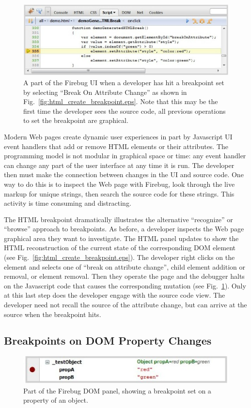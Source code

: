 \documentclass{www2010-accepted}
\begin{document}
\begin{figure}[htp]
\center
\includegraphics[scale=0.7]{html_mutation_on_break.eps}
\caption{A part of the Firebug UI when a developer has hit a breakpoint set by selecting ``Break On Attribute Change'' as shown in Fig.~\ref{fig:html_create_breakpoint.eps}. Note that this may be the first time the
developer sees the source code, all previous operations to set the breakpoint are graphical.}
\label{fig:html_mutation_on_break.eps}
\end{figure}

Modern Web pages create dynamic user experiences in part by Javascript
UI event handlers that add or remove HTML elements or their
attributes. The programming model is not modular in graphical space or
time: any event handler can change any part of the user interface at
any time it is run. The developer then must make the connection
between changes in the UI and source code. One way to do this is to
inspect the Web page with Firebug, look through the live markup for
unique strings, then search the source code for these strings. This
activity is time consuming and distracting.


The HTML breakpoint dramatically illustrates the alternative ``recognize'' or
``browse'' approach to breakpoints. As before, a developer inspects
the Web page graphical area they want to investigate. The HTML panel
updates to show the HTML reconstruction of the current state of the
corresponding DOM element (see
Fig.~\ref{fig:html_create_breakpoint.eps}). The developer right clicks
on the element and selects one of ``break on attribute change'', child
element addition or removal, or element removal. Then they operate the
page and the debugger halts on the Javascript code that causes the
corresponding mutation (see Fig.~\ref{fig:html_mutation_on_break.eps}).
Only at this last step does the developer engage with the source code
view. The developer need not recall the source of the attribute change, but 
can arrive at the source when the breakpoint hits.


\subsection{Breakpoints on DOM Property Changes}
\begin{figure}[htp]
\center
\includegraphics[scale=0.7]{dom_property_breakpoint.eps}
\caption{Part of the Firebug DOM panel, showing a breakpoint set on a property of an object.}
\label{fig:dom_property_breakpoint.eps}
\end{figure}
\end{document}

